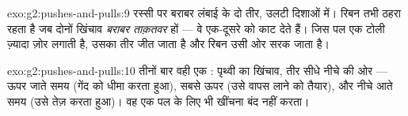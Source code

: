 \begin{solution}{exo:g2:pushes-and-pulls:9}
रस्सी पर बराबर लंबाई के दो तीर, उलटी दिशाओं में। रिबन तभी ठहरा रहता
है जब दोनों खिंचाव \emph{बराबर ताक़तवर} हों --- वे एक-दूसरे को काट
देते हैं। जिस पल एक टोली ज़्यादा ज़ोर लगाती है, उसका तीर जीत जाता है
और रिबन उसी ओर सरक जाता है।
\end{solution}

\begin{solution}{exo:g2:pushes-and-pulls:10}
तीनों बार वही एक : पृथ्वी का खिंचाव, तीर सीधे नीचे की ओर --- ऊपर
जाते समय (गेंद को धीमा करता हुआ), सबसे ऊपर (उसे वापस लाने को तैयार),
और नीचे आते समय (उसे तेज़ करता हुआ)। वह एक पल के लिए भी खींचना बंद
नहीं करता।
\end{solution}
